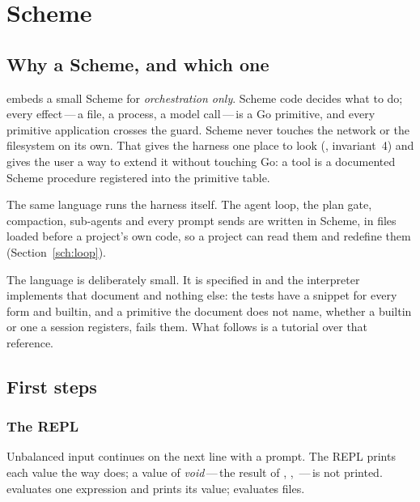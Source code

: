 \part{\nodwyn{} Scheme}

\chapter{Why a Scheme, and which one}

\nodwyn{} embeds a small Scheme for \emph{orchestration only}. Scheme code
decides what to do; every effect\,---\,a file, a process, a model call\,---\,is a
Go primitive, and every primitive application crosses the guard. Scheme
never touches the network or the filesystem on its own. That gives the
harness one place to look (, invariant~4) and gives the user a way to
extend it without touching Go: a tool is a documented Scheme procedure
registered into the primitive table.

The same language runs the harness itself. The agent loop, the plan gate,
compaction, sub-agents and every prompt \nodwyn{} sends are written in
Scheme, in files loaded before a project's own code, so a project can read
them and redefine them (Section~\ref{sch:loop}).

The language is deliberately small. It is specified in
 and the interpreter implements that document and
nothing else: the tests have a snippet for every form and builtin, and a
primitive the document does not name, whether a builtin or one a session
registers, fails them. What follows is a tutorial over that reference.

\chapter{First steps}

\section{The REPL}


Unbalanced input continues on the next line with a  prompt. The
REPL prints each value the way  does; a value of
\emph{void}\,---\,the result of , ,
\,---\,is not printed.  evaluates one
expression and prints its value;  evaluates files.

